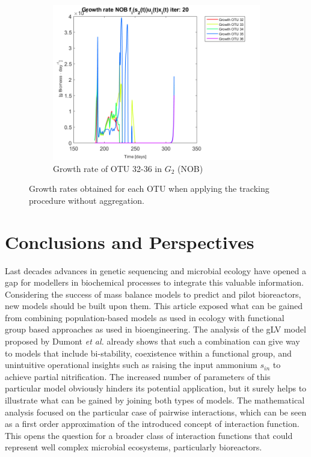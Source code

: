 \documentclass[3p,times]{article}
\begin{document}
\begin{figure}[h]
\begin{subfigure}{0.45 \textwidth}
	\includegraphics[width =\textwidth]{Application//200407_iter_20_growth_control_NOB_plot_1}
	\caption{Growth rate of OTU 32-36 in $G_2$ (NOB) }
	\end{subfigure}
	\caption{Growth rates obtained for each OTU when applying the tracking procedure without aggregation.}
	\label{growth all}
\end{figure}


\clearpage
\section{Conclusions and Perspectives}

Last decades advances in genetic sequencing and microbial ecology have opened a gap for modellers in biochemical processes to integrate this valuable information. Considering the success of mass balance models to predict and pilot bioreactors, new models should be built upon them. This article exposed what can be gained from combining population-based models as used in ecology with functional group based approaches as used in bioengineering. The analysis of the gLV model proposed by Dumont \textit{et al.} \cite{Dumont2016} already shows that such a combination can give way to models that include bi-stability, coexistence within a functional group, and unintuitive operational insights such as raising the input ammonium $s_{in}$ to achieve partial nitrification. The increased number of parameters of this particular model obviously hinders its potential application, but it surely helps to illustrate what can be gained by joining both types of models. The mathematical analysis focused on the particular case of pairwise interactions, which can be seen as a first order approximation of the introduced concept of interaction function. This opens the question for a broader class of interaction functions that could represent well complex microbial ecosystems, particularly bioreactors. 
\end{document}
